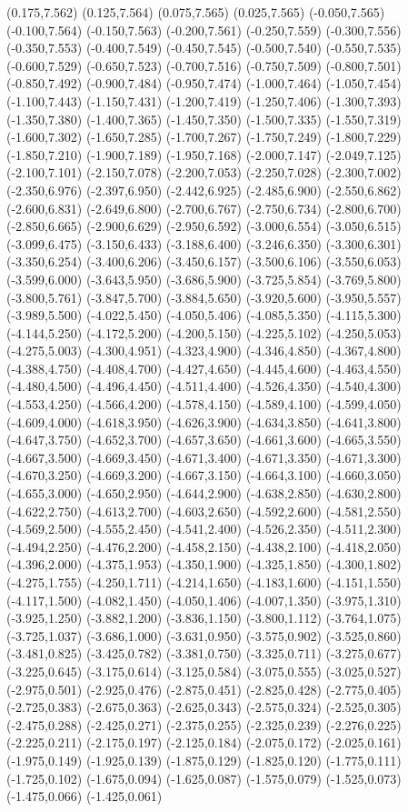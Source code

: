 (0.175,7.562) (0.125,7.564) (0.075,7.565) (0.025,7.565) (-0.050,7.565) (-0.100,7.564) (-0.150,7.563) (-0.200,7.561) (-0.250,7.559) (-0.300,7.556) (-0.350,7.553) (-0.400,7.549) (-0.450,7.545) (-0.500,7.540) (-0.550,7.535) (-0.600,7.529) (-0.650,7.523) (-0.700,7.516) (-0.750,7.509) (-0.800,7.501) (-0.850,7.492) (-0.900,7.484) (-0.950,7.474) (-1.000,7.464) (-1.050,7.454) (-1.100,7.443) (-1.150,7.431) (-1.200,7.419) (-1.250,7.406) (-1.300,7.393) (-1.350,7.380) (-1.400,7.365) (-1.450,7.350) (-1.500,7.335) (-1.550,7.319) (-1.600,7.302) (-1.650,7.285) (-1.700,7.267) (-1.750,7.249) (-1.800,7.229) (-1.850,7.210) (-1.900,7.189) (-1.950,7.168) (-2.000,7.147) (-2.049,7.125) (-2.100,7.101) (-2.150,7.078) (-2.200,7.053) (-2.250,7.028) (-2.300,7.002) (-2.350,6.976) (-2.397,6.950) (-2.442,6.925) (-2.485,6.900) (-2.550,6.862) (-2.600,6.831) (-2.649,6.800) (-2.700,6.767) (-2.750,6.734) (-2.800,6.700) (-2.850,6.665) (-2.900,6.629) (-2.950,6.592) (-3.000,6.554) (-3.050,6.515) (-3.099,6.475) (-3.150,6.433) (-3.188,6.400) (-3.246,6.350) (-3.300,6.301) (-3.350,6.254) (-3.400,6.206) (-3.450,6.157) (-3.500,6.106) (-3.550,6.053) (-3.599,6.000) (-3.643,5.950) (-3.686,5.900) (-3.725,5.854) (-3.769,5.800) (-3.800,5.761) (-3.847,5.700) (-3.884,5.650) (-3.920,5.600) (-3.950,5.557) (-3.989,5.500) (-4.022,5.450) (-4.050,5.406) (-4.085,5.350) (-4.115,5.300) (-4.144,5.250) (-4.172,5.200) (-4.200,5.150) (-4.225,5.102) (-4.250,5.053) (-4.275,5.003) (-4.300,4.951) (-4.323,4.900) (-4.346,4.850) (-4.367,4.800) (-4.388,4.750) (-4.408,4.700) (-4.427,4.650) (-4.445,4.600) (-4.463,4.550) (-4.480,4.500) (-4.496,4.450) (-4.511,4.400) (-4.526,4.350) (-4.540,4.300) (-4.553,4.250) (-4.566,4.200) (-4.578,4.150) (-4.589,4.100) (-4.599,4.050) (-4.609,4.000) (-4.618,3.950) (-4.626,3.900) (-4.634,3.850) (-4.641,3.800) (-4.647,3.750) (-4.652,3.700) (-4.657,3.650) (-4.661,3.600) (-4.665,3.550) (-4.667,3.500) (-4.669,3.450) (-4.671,3.400) (-4.671,3.350) (-4.671,3.300) (-4.670,3.250) (-4.669,3.200) (-4.667,3.150) (-4.664,3.100) (-4.660,3.050) (-4.655,3.000) (-4.650,2.950) (-4.644,2.900) (-4.638,2.850) (-4.630,2.800) (-4.622,2.750) (-4.613,2.700) (-4.603,2.650) (-4.592,2.600) (-4.581,2.550) (-4.569,2.500) (-4.555,2.450) (-4.541,2.400) (-4.526,2.350) (-4.511,2.300) (-4.494,2.250) (-4.476,2.200) (-4.458,2.150) (-4.438,2.100) (-4.418,2.050) (-4.396,2.000) (-4.375,1.953) (-4.350,1.900) (-4.325,1.850) (-4.300,1.802) (-4.275,1.755) (-4.250,1.711) (-4.214,1.650) (-4.183,1.600) (-4.151,1.550) (-4.117,1.500) (-4.082,1.450) (-4.050,1.406) (-4.007,1.350) (-3.975,1.310) (-3.925,1.250) (-3.882,1.200) (-3.836,1.150) (-3.800,1.112) (-3.764,1.075) (-3.725,1.037) (-3.686,1.000) (-3.631,0.950) (-3.575,0.902) (-3.525,0.860) (-3.481,0.825) (-3.425,0.782) (-3.381,0.750) (-3.325,0.711) (-3.275,0.677) (-3.225,0.645) (-3.175,0.614) (-3.125,0.584) (-3.075,0.555) (-3.025,0.527) (-2.975,0.501) (-2.925,0.476) (-2.875,0.451) (-2.825,0.428) (-2.775,0.405) (-2.725,0.383) (-2.675,0.363) (-2.625,0.343) (-2.575,0.324) (-2.525,0.305) (-2.475,0.288) (-2.425,0.271) (-2.375,0.255) (-2.325,0.239) (-2.276,0.225) (-2.225,0.211) (-2.175,0.197) (-2.125,0.184) (-2.075,0.172) (-2.025,0.161) (-1.975,0.149) (-1.925,0.139) (-1.875,0.129) (-1.825,0.120) (-1.775,0.111) (-1.725,0.102) (-1.675,0.094) (-1.625,0.087) (-1.575,0.079) (-1.525,0.073) (-1.475,0.066) (-1.425,0.061) 